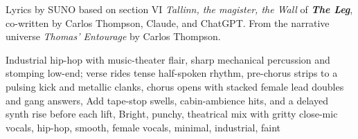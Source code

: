 
\begin{notes}
Lyrics by SUNO based on section VI \emph{Tallinn, the magister, the Wall} of \emph{\bfseries The Leg}, %
co-written by Carlos Thompson, Claude, and ChatGPT. %
From the narrative universe \emph{Thomas’ Entourage} by Carlos Thompson.
\end{notes}
\begin{style}
Industrial hip-hop with music-theater flair, sharp mechanical percussion and stomping low-end; verse rides tense half-spoken rhythm, pre-chorus strips to a pulsing kick and metallic clanks, chorus opens with stacked female lead doubles and gang answers, Add tape-stop swells, cabin-ambience hits, and a delayed synth rise before each lift, Bright, punchy, theatrical mix with gritty close-mic vocals, hip-hop, smooth, female vocals, minimal, industrial, faint
\end{style}
